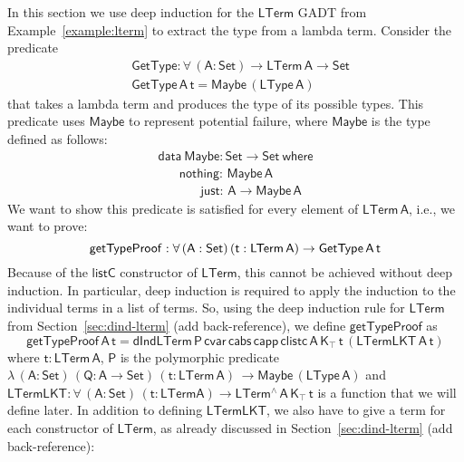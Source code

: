 \documentclass[9pt]{entcs}
\begin{document}
In this section we use deep induction for the $\mathsf{LTerm}$ GADT from Example~\ref{example:lterm} to 
extract the type from a lambda term.
Consider the predicate 
\begin{align*}
  &\mathsf{GetType : \forall \, (A : Set) \to LTerm\,A \to Set} \\
  &\mathsf{GetType \,A \,t = Maybe \, (LType \, A)}
\end{align*}
that takes a lambda term and produces the type of its possible types.
This predicate uses $\mathsf{Maybe}$ to represent
potential failure, where $\mathsf{Maybe}$ is the type defined as follows:
\begin{equation}\label{eq:maybe}
\begin{array}{l}
\mathsf{data\ Maybe : Set \to Set\ where}\\
\mathsf{\;\;\;\;\;\;nothing :\, Maybe\,A}\\
\mathsf{\;\;\;\;\;\;\;\;\;\;\;\;just :\, A \to Maybe\,A}
\end{array}
\end{equation}
We want to show this predicate is satisfied for every element of $\mathsf{LTerm\,A}$,
i.e., we want to prove: 
\[
  \mathsf{getTypeProof : \forall \, (A : Set)\, (t : LTerm\,A) \to GetType \,A \,t} \\
\]
Because of the $\mathsf{listC}$ constructor of $\mathsf{LTerm}$, this cannot be achieved without 
deep induction. In particular, deep induction is required to apply the induction to the 
individual terms in a list of terms. 
So, using the deep induction rule for $\mathsf{LTerm}$ from Section~\ref{sec:dind-lterm} {\color{red} (add back-reference)},
we define $\mathsf{getTypeProof}$ as
\[
  \mathsf{getTypeProof \,A \,t = 
    dIndLTerm\, P \,
    cvar\,  cabs\,  capp\,  clistc\,  A\, K_\top\, t\, (LTermLKT\, A\, t)
    }
\]
where $\mathsf{t : LTerm\,A}$,
$\mathsf{P}$ is the polymorphic predicate $\mathsf{\lambda \, (A: Set)\, (Q : A \to Set)\, (t : LTerm\,A)\, \to Maybe \, (LType \, A)}$
and $\mathsf{LTermLKT : \forall\, (A : Set)\, (t : LTerm A) \to LTerm^{\wedge}\, A\, K_\top\,t}$
is a function that we will define later.
In addition to defining $\mathsf{LTermLKT}$,
we also have to give a term for each constructor of $\mathsf{LTerm}$,
as already discussed in Section~\ref{sec:dind-lterm} {\color{red} (add back-reference)}:
\end{document}
